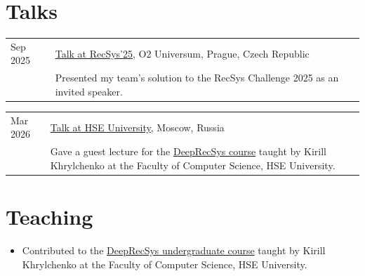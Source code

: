 \documentclass[10pt,letterpaper]{article}
\makeatletter
\newcommand{\cvsection}[1]{\section*{#1}}
\newcommand{\daterow}[3]{%
  \begin{tabularx}{\textwidth}{@{}p{1.18in}X@{}}
    #1 & #2\\
       & #3
  \end{tabularx}\vspace{0.18em}
}
\newcommand{\compactitem}[1]{\item #1}
\makeatother
\begin{document}
\cvsection{Talks}
\daterow{Sep 2025}{\href{https://neuralsrg.github.io/talks/2025-09-22-challenge}{Talk at RecSys'25}, O2 Universum, Prague, Czech Republic}{Presented my team's solution to the RecSys Challenge 2025 as an invited speaker.}
\daterow{Mar 2026}{\href{https://neuralsrg.github.io/talks/2026-03-24-challenge_hse}{Talk at HSE University}, Moscow, Russia}{Gave a guest lecture for the \href{https://github.com/KhrylchenkoKirill/DeepRecSys}{DeepRecSys course} taught by Kirill Khrylchenko at the Faculty of Computer Science, HSE University.}

\cvsection{Teaching}
\begin{itemize}
  \compactitem{Contributed to the \href{https://github.com/KhrylchenkoKirill/DeepRecSys}{DeepRecSys undergraduate course} taught by Kirill Khrylchenko at the Faculty of Computer Science, HSE University.}
\end{itemize}
\end{document}
